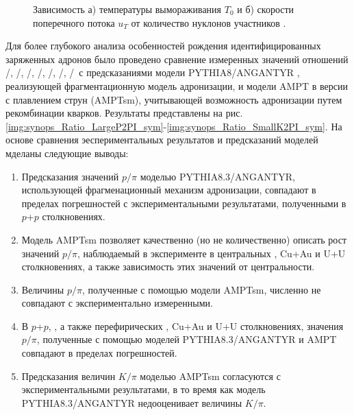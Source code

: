 \begin{figure}[ht]
	\caption{Зависимость а) температуры вымораживания $T_0$ и  б) скорости поперечного потока $u_T$ от количество нуклонов участников \Npart.}\label{fig:synops_T0ut}
\end{figure}
Для более глубокого анализа особенностей рождения идентифицированных заряженных адронов было проведено сравнение измеренных значений отношений  \pim/\pip, \Km/\Kp, \prot/\aprot, \prot/\pip, \aprot/\pim, \Kp/\pip, \Km/\pim \ с предсказаниями модели PYTHIA8/ANGANTYR \cite{pythia}, реализующей фрагментационную модель адронизации, и модели AMPT в версии с плавлением струн (AMPTsm)\cite{AMPT}, учитывающей возможность адронизации путем рекомбинации кварков. 
Результаты представлены на рис. \ref{img:synops_Ratio_LargeP2PI_sym}-\ref{img:synops_Ratio_SmallK2PI_sym}.
На основе сравнения эеспериментальных результатов и предсказаний моделей мделаны следующие выводы:

\begin{enumerate}
	\item Предсказания значений $p/\pi$ моделью PYTHIA8.3/ANGANTYR, использующей фрагменационный механизм адронизации, совпадают в пределах погрешностей с экспериментальными результатами, полученными в $p$+$p$ столкновениях. 
	\item Модель AMPTsm позволяет качественно (но не количественно) описать рост значений $p/\pi$, наблюдаемый в эксперименте в центральных \heau, Cu+Au и U+U столкновениях, а также зависимость этих значений от центральности. 
	\item Величины $p/\pi$, полученные с помощью модели AMPTsm, численно не совпадают с экспериментально измеренными. 
	\item В $p$+$p$, \pal, а также перефирических \heau, Cu+Au и U+U столкновениях, значения $p/\pi$, полученные с помощью моделей PYTHIA8.3/ANGANTYR и AMPT совпадают в пределах погрешностей.
	\item Предсказания величин $K/\pi$ моделью AMPTsm согласуются с экспериментальными результатами, в то время как модель PYTHIA8.3/ANGANTYR недооценивает величины $K/\pi$.
\end{enumerate}

